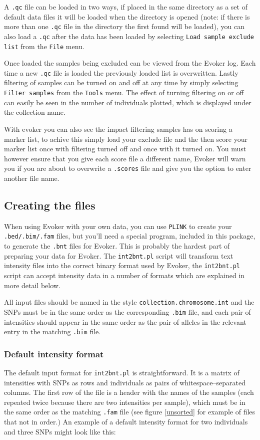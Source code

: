 \documentclass{article}
\begin{document}
A \texttt{.qc}  file can be loaded in two ways, if placed in the same directory as a set of default data files it will be loaded when the directory is opened  (note: if there is more than one \texttt{.qc} file in the directory the first found will be loaded), you can also load a  \texttt{.qc} after the data has been loaded by selecting \texttt{Load sample exclude list} from the \texttt{File} menu. 

Once loaded the samples being excluded can be viewed from the Evoker log. Each time a new \texttt{.qc} file is loaded the previously loaded list is overwritten. Lastly filtering of samples can be turned on and off at any time by simply selecting \texttt{Filter samples} from the \texttt{Tools} menu. The effect of turning filtering on or off can easily be seen in the number of individuals plotted, which is displayed under the collection name.

With evoker you can also see the impact filtering samples has on scoring a marker list, to achive this simply load your exclude file and the then score your marker list once with filtering turned off and once with it turned on. You must however ensure that you give each score file a different name, Evoker will warn you if you are about to overwrite a \texttt{.scores} file and give you the option to enter another file name.

\subsection{Creating the files}

When using Evoker with your own data, you can use \texttt{PLINK} to create your \texttt{.bed/.bim/.fam} files, but you'll need a special program, included in this package, to generate the \texttt{.bnt} files for Evoker. This is probably the hardest part of preparing your data for Evoker. The \texttt{int2bnt.pl} script will transform text intensity files into the correct binary format used by Evoker, the \texttt{int2bnt.pl} script can accept intensity data in a number of formats which are explained in more detail below.

All input files should be named in the style \texttt{collection.chromosome.int} and the SNPs must be in the same order as the corresponding \texttt{.bim} file, and each pair of intensities should appear in the same order as the pair of alleles in the relevant entry in the matching \texttt{.bim} file.

\subsubsection{Default intensity format}
The default input format for \texttt{int2bnt.pl} is straightforward. It is a matrix of intensities with SNPs as rows and individuals as pairs of whitespace--separated columns. The first row of the file is a header with the names of the samples (each repeated twice because there are two intensities per sample), which must be in the same order as the matching \texttt{.fam} file (see figure \ref{unsorted} for example of files that not in order.) An example of a default intensity format for two individuals and three SNPs might look like this:
\end{document}
